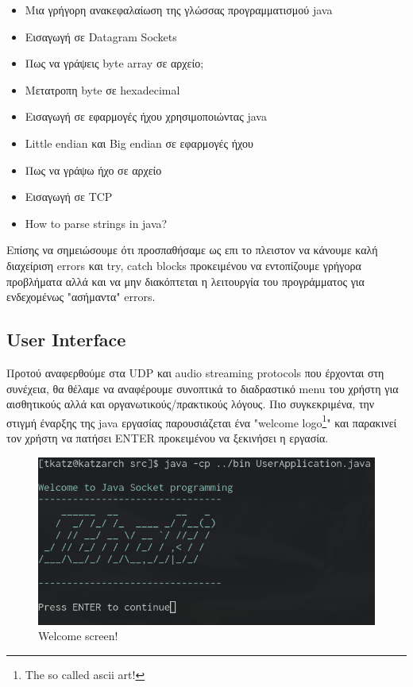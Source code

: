 \documentclass[hidelinks, 12pt, a4paper]{article}
\begin{document}
\begin{itemize}
    \item Μια γρήγορη ανακεφαλαίωση της γλώσσας προγραμματισμού java \cite{derek}
    \item Εισαγωγή σε Datagram Sockets \cite{romaniancoder, oracle}
    \item Πως να γράψεις byte array σε αρχείο; \cite{javafile}
    \item Μετατροπη byte σε hexadecimal \cite{programizhex}
    \item Εισαγωγή σε εφαρμογές ήχου χρησιμοποιώντας java \cite{oraclesound}
    \item Little endian και Big endian σε εφαρμογές ήχου \cite{stackendian}
    \item Πως να γράψω ήχο σε αρχείο \cite{stackaudiofile}
    \item Εισαγωγή σε TCP \cite{tutorpoints, mediumtcp, codejava}
    \item How to parse strings in java? \cite{stackparsestring}
\end{itemize}


Επίσης να σημειώσουμε ότι προσπαθήσαμε ως επι το πλειστον να κάνουμε καλή διαχείριση errors και try, catch blocks προκειμένου να εντοπίζουμε γρήγορα προβλήματα αλλά και να μην διακόπτεται η λειτουργία του προγράμματος για ενδεχομένως "ασήμαντα" errors.

\subsection{User Interface}

Προτού αναφερθούμε στα UDP και audio streaming protocols που έρχονται στη συνέχεια, θα θέλαμε να αναφέρουμε συνοπτικά το διαδραστικό menu του χρήστη για αισθητικούς αλλά και οργανωτικούς/πρακτικούς λόγους. Πιο συγκεκριμένα, την στιγμή έναρξης της java εργασίας παρουσιάζεται ένα "welcome logo\footnote{The so called ascii art!}" και παρακινεί τον χρήστη να πατήσει ENTER προκειμένου να ξεκινήσει η εργασία.

\begin{figure}[h!]
\centering
	\includegraphics[height=.3\textheight, width=\textwidth]{assets/ui_welcome.png}
	\caption{Welcome screen!} 
    \label{fig:ui}
\end{figure}
\end{document}
